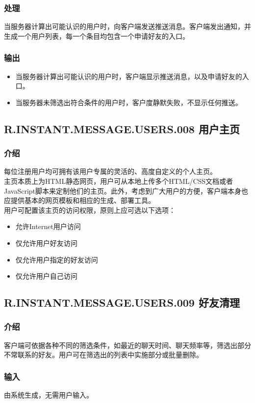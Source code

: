 {\subsubsection{处理}
当服务器计算出可能认识的用户时，向客户端发送推送消息。客户端发出通知，并生成一个用户列表，每一个条目均包含一个申请好友的入口。
\subsubsection{输出}
\begin{itemize}
	\item 当服务器计算出可能认识的用户时，客户端显示推送消息，以及申请好友的入口。
	\item 当服务器未筛选出符合条件的用户时，客户度静默失败，不显示任何推送。
\end{itemize}

\subsection{R.INSTANT.MESSAGE.USERS.008 用户主页}
\subsubsection{介绍}
每位注册用户均可拥有该用户专属的灵活的、高度自定义的个人主页。\\
主页本质上为HTML静态网页，用户可从本地上传多个HTML/CSS文档或者JavaScript脚本来定制他们的主页。此外，考虑到广大用户的方便，客户端本身也应提供基本的网页模板和相应的生成、部署工具。\\
用户可配置该主页的访问权限，原则上应可选以下选项：
\begin{itemize}
	\item 允许Internet用户访问
	\item 仅允许用户好友访问
	\item 仅允许用户指定的好友访问
	\item 仅允许用户自己访问
\end{itemize}


\subsection{R.INSTANT.MESSAGE.USERS.009 好友清理}
\subsubsection{介绍}
客户端可依据各种不同的筛选条件，如最近的聊天时间、聊天频率等，筛选出部分不常联系的好友。用户可在筛选出的列表中实施部分或批量删除。
\subsubsection{输入}
由系统生成，无需用户输入。
}
